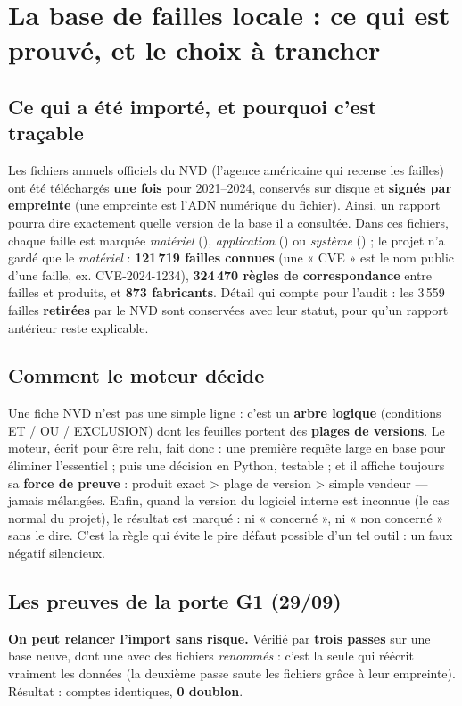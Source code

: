 \documentclass[10pt,a4paper]{article}
\providecommand{\NoAutoSpacing}{}
\newcommand{\code}[1]{{\NoAutoSpacing\ttfamily\detokenize{#1}}}
\begin{document}
\section{La base de failles locale : ce qui est prouvé, et le choix à trancher}
\subsection{Ce qui a été importé, et pourquoi c'est traçable}
Les fichiers annuels officiels du NVD (l'agence américaine qui recense les failles) ont été
téléchargés \textbf{une fois} pour 2021–2024, conservés sur disque et \textbf{signés par empreinte}
(une empreinte est l'ADN numérique du fichier). Ainsi, un rapport pourra dire exactement quelle
version de la base il a consultée. Dans ces fichiers, chaque faille est marquée \emph{matériel}
(\code{h}), \emph{application} (\code{a}) ou \emph{système} (\code{o}) ; le projet n'a gardé que
le \emph{matériel} : \textbf{121\,719 failles connues} (une « CVE » est le nom public d'une faille,
ex. CVE-2024-1234), \textbf{324\,470 règles de correspondance} entre failles et produits, et
\textbf{873 fabricants}. Détail qui compte pour l'audit : les 3\,559 failles \textbf{retirées}
par le NVD sont conservées avec leur statut, pour qu'un rapport antérieur reste explicable.

\subsection{Comment le moteur décide}
Une fiche NVD n'est pas une simple ligne : c'est un \textbf{arbre logique} (conditions ET / OU /
EXCLUSION) dont les feuilles portent des \textbf{plages de versions}. Le moteur, écrit pour être
relu, fait donc : une première requête large en base pour éliminer l'essentiel ; puis une décision
en Python, testable ; et il affiche toujours sa \textbf{force de preuve} : produit exact > plage de
version > simple vendeur — jamais mélangées. Enfin, quand la version du logiciel interne est
inconnue (le cas normal du projet), le résultat est marqué \code{unresolved} : ni « concerné », ni
« non concerné » sans le dire. C'est la règle qui évite le pire défaut possible d'un tel outil : un
faux négatif silencieux.

\subsection{Les preuves de la porte G1 (29/09)}
\textbf{On peut relancer l'import sans risque.} Vérifié par \textbf{trois passes} sur une base
neuve, dont une avec des fichiers \emph{renommés} : c'est la seule qui réécrit vraiment les
données (la deuxième passe saute les fichiers grâce à leur empreinte). Résultat : comptes
identiques, \textbf{0 doublon}.
\end{document}
